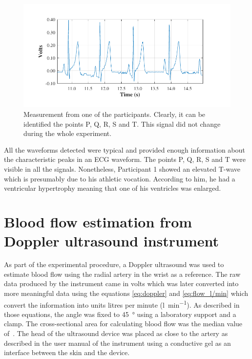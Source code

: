 \begin{figure}[!htbp]
	\centering
	\includegraphics{figure19}    
	\caption[ECG measurement acquired by the system]{Measurement from one of the participants. Clearly, it can be identified the points P, Q, R, S and T. This signal did not change during the whole experiment.}
	\label{fig:ECG}
\end{figure} 

All the waveforms detected were typical and provided enough information about the characteristic peaks in an ECG waveform. The points P, Q, R, S and T were visible in all the signals. Nonetheless, Participant 1 showed an elevated T-wave which is presumably due to his athletic vocation. According to him, he had a ventricular hypertrophy meaning that one of his ventricles was enlarged.  

\section{Blood flow estimation from Doppler ultrasound instrument}
\label{section comparison 2}
As part of the experimental procedure, a Doppler ultrasound was used to estimate blood flow using the radial artery in the wrist as a reference. The raw data produced by the instrument came in volts which was later converted into more meaningful data using the equations \ref {eq:doppler} and \ref {eq:flow_l/min} which convert the information into units litres per minute (\si{\litre\per\minute}). As described in those equations, the angle was fixed to \SI{45}{\degree} using a laboratory support and a clamp. The cross-sectional area for calculating blood flow was the median value of~\cite {ashraf2010size}. The head of the ultrasound device was placed as close to the artery as described in the user manual of the instrument using a conductive gel as an interface between the skin and the device.

